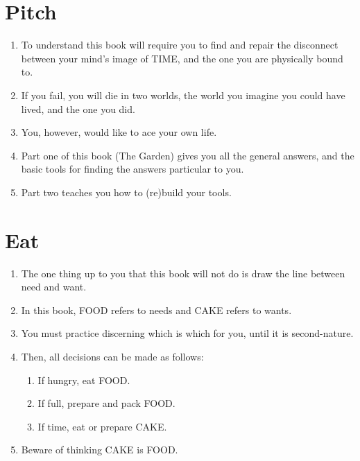 \documentclass[
]{book}
\providecommand{\tightlist}{%
  \setlength{\itemsep}{0pt}\setlength{\parskip}{0pt}}
\begin{document}
\hypertarget{pitch}{%
\section{Pitch}\label{pitch}}

\begin{enumerate}
\def\labelenumi{\arabic{enumi}.}
\setcounter{enumi}{17}
\item
  To understand this book will require you to find and repair the disconnect between your mind's image of TIME, and the one you are physically bound to.
\item
  If you fail, you will die in two worlds, the world you imagine you could have
  lived, and the one you did.
\item
  You, however, would like to ace your own life.
\item
  Part one of this book (The Garden) gives you all the general answers, and the basic tools for finding the answers particular to you.
\item
  Part two teaches you how to (re)build your tools.
\end{enumerate}

\hypertarget{eat}{%
\section{Eat}\label{eat}}

\begin{enumerate}
\def\labelenumi{\arabic{enumi}.}
\setcounter{enumi}{22}
\tightlist
\item
  The one thing up to you that this book will not do is draw the line between need and want.
\item
  In this book, FOOD refers to needs and CAKE refers to wants.
\item
  You must practice discerning which is which for you, until it is second-nature.
\item
  Then, all decisions can be made as follows:

  \begin{enumerate}
  \def\labelenumii{\arabic{enumii}.}
  \tightlist
  \item
    If hungry, eat FOOD.
  \item
    If full, prepare and pack FOOD.
  \item
    If time, eat or prepare CAKE.
  \end{enumerate}
\item
  Beware of thinking CAKE is FOOD.
\end{enumerate}
\end{document}
